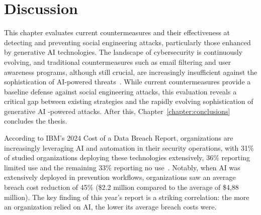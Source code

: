 


\chapter{Discussion\label{chapter:discussion}}
\begin{comment}

    - OpenAI attempts to control how ChatGPT etc are used
    - Efficacy of EU and other level regulations
    - Instagram flagging content that might've been generated with AI (this is futile in the future?)

\end{comment}

This chapter evaluates current countermeasures and their effectiveness at detecting and preventing social engineering attacks, particularly those enhanced by generative AI technologies. The landscape of cybersecurity is continuously evolving, and traditional countermeasures such as email filtering and user awareness programs, although still crucial, are increasingly insufficient against the sophistication of AI-powered threats~\citep{fakhouri_AI_Driven_Solutions_SE_Attacks_2024}. While current countermeasures provide a baseline defense against social engineering attacks, this evaluation reveals a critical gap between existing strategies and the rapidly evolving sophistication of generative AI -powered attacks. After this, Chapter~\ref{chapter:conclusions} concludes the thesis.






According to IBM's 2024 Cost of a Data Breach Report, organizations are increasingly leveraging AI and automation in their security operations, with 31\% of studied organizations deploying these technologies extensively, 36\% reporting limited use and the remaining 33\% reporting no use~\citep{ibm_Cost_Data_Breach_Report_2024}. Notably, when AI was extensively deployed in prevention workflows, organizations saw an average breach cost reduction of 45\% (\$2.2 million compared to the average of \$4,88 million). The key finding of this year's report is a striking correlation: the more an organization relied on AI, the lower its average breach costs were.






